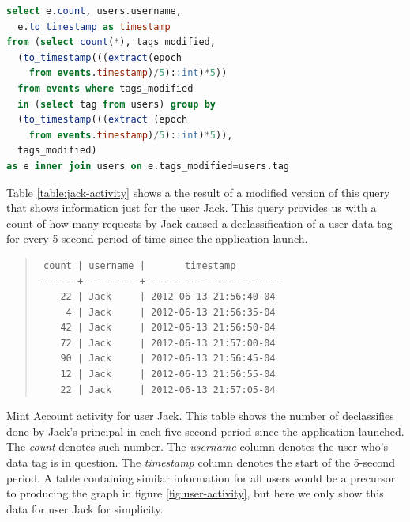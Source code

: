 \begin{lstlisting}[language=SQL, deletendkeywords={TIMESTAMP}, label=code:query-accesses]
select e.count, users.username, 
  e.to_timestamp as timestamp 
from (select count(*), tags_modified, 
  (to_timestamp(((extract(epoch 
    from events.timestamp)/5)::int)*5)) 
  from events where tags_modified 
  in (select tag from users) group by
  (to_timestamp(((extract (epoch 
    from events.timestamp)/5)::int)*5)), 
  tags_modified) 
as e inner join users on e.tags_modified=users.tag
\end{lstlisting}

Table \ref{table:jack-activity} shows a the result of a modified version of this query that shows information just for the user Jack. This query provides us with a count of how many requests by Jack caused a declassification of a user data tag for every 5-second period of time since the application launch.

\begin{table}
\begin{quote}
\begin{verbatim}
 count | username |       timestamp        
-------+----------+------------------------
    22 | Jack     | 2012-06-13 21:56:40-04
     4 | Jack     | 2012-06-13 21:56:35-04
    42 | Jack     | 2012-06-13 21:56:50-04
    72 | Jack     | 2012-06-13 21:57:00-04
    90 | Jack     | 2012-06-13 21:56:45-04
    12 | Jack     | 2012-06-13 21:56:55-04
    22 | Jack     | 2012-06-13 21:57:05-04
\end{verbatim}
\end{quote}
\caption[Mint Account activity for user Jack]{Mint Account activity for user Jack. This table shows the number of declassifies done by Jack's principal in each five-second period since the application launched. The \emph{count} denotes such number. The \emph{username} column denotes the user who's data tag is in question. The \emph{timestamp} column denotes the start of the 5-second period. A table containing similar information for all users would be a precursor to producing the graph in figure \ref{fig:user-activity}, but here we only show this data for user Jack for simplicity.}
\label{table:jack-activity}
\end{table}
